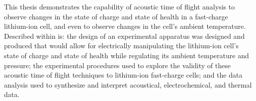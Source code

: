 This thesis demonstrates the capability of acoustic time of flight analysis to observe changes in the state of charge and state of health in a fast-charge lithium-ion cell, and even to observe changes in the cell's ambient temperature. Described within is: the design of an experimental apparatus was designed and produced that would allow for electrically manipulating the lithium-ion cell's state of charge and state of health while regulating its ambient temperature and pressure; the experimental procedures used to explore the validity of these acoustic time of flight techniques to lithium-ion fast-charge cells; and the data analysis used to synthesize and interpret acoustical, electrochemical, and thermal data.